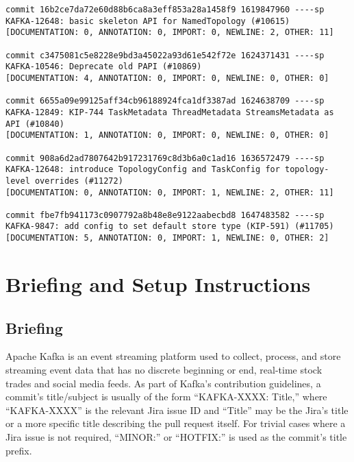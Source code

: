 \begin{lstlisting}
commit 16b2ce7da72e60d88b6ca8a3eff853a28a1458f9 1619847960 ----sp
KAFKA-12648: basic skeleton API for NamedTopology (#10615)                                          
[DOCUMENTATION: 0, ANNOTATION: 0, IMPORT: 0, NEWLINE: 2, OTHER: 11]

commit c3475081c5e8228e9bd3a45022a93d61e542f72e 1624371431 ----sp
KAFKA-10546: Deprecate old PAPI (#10869)                                                            
[DOCUMENTATION: 4, ANNOTATION: 0, IMPORT: 0, NEWLINE: 0, OTHER: 0]

commit 6655a09e99125aff34cb96188924fca1df3387ad 1624638709 ----sp
KAFKA-12849: KIP-744 TaskMetadata ThreadMetadata StreamsMetadata as API (#10840)                    
[DOCUMENTATION: 1, ANNOTATION: 0, IMPORT: 0, NEWLINE: 0, OTHER: 0]

commit 908a6d2ad7807642b917231769c8d3b6a0c1ad16 1636572479 ----sp
KAFKA-12648: introduce TopologyConfig and TaskConfig for topology-level overrides (#11272)          
[DOCUMENTATION: 0, ANNOTATION: 0, IMPORT: 1, NEWLINE: 2, OTHER: 11]

commit fbe7fb941173c0907792a8b48e8e9122aabecbd8 1647483582 ----sp
KAFKA-9847: add config to set default store type (KIP-591) (#11705)                                 
[DOCUMENTATION: 5, ANNOTATION: 0, IMPORT: 1, NEWLINE: 0, OTHER: 2]
\end{lstlisting}

\section{Briefing and Setup Instructions}
\label{sec:Briefing-and-Setup}

\subsection{Briefing}
\label{subsec:Briefing}

Apache Kafka is an event streaming platform used to collect, process, and store streaming event data that has no discrete beginning or end, \eg real-time stock trades and social media feeds. 
As part of Kafka’s contribution guidelines, a commit’s title/subject is usually of the form ``KAFKA-XXXX: Title,'' where ``KAFKA-XXXX'' is the relevant Jira issue ID and ``Title'' may be the Jira’s title or a more specific title describing the pull request itself. 
For trivial cases where a Jira issue is not required, ``MINOR:'' or ``HOTFIX:'' is used as the commit’s title prefix.

